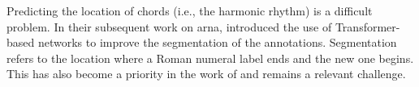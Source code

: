 

Predicting the location of chords (i.e., the harmonic
rhythm) is a difficult problem. In their subsequent work on
\gls{arna}, \textcite{chen2019harmony,chen2021attend}
introduced the use of Transformer-based networks
\parencite{vaswani2017attention} to improve the segmentation
of the annotations. Segmentation refers to the location
where a Roman numeral label ends and the new one begins.
This has also become a priority in the work of
\textcite{micchi2021deep} and remains a relevant challenge.
